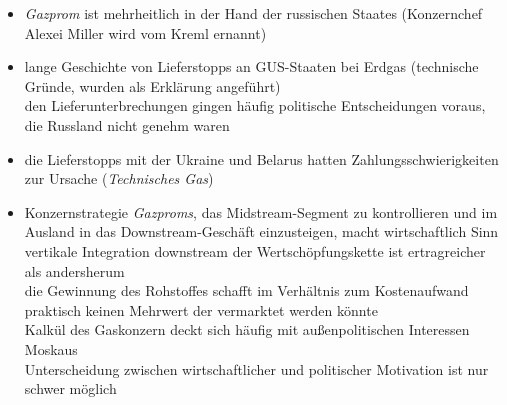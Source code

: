 \documentclass[11pt,a4paper]{article}
\begin{document}
\begin{itemize}

\item \emph{Gazprom} ist mehrheitlich in der Hand der russischen Staates (Konzernchef Alexei Miller wird vom Kreml ernannt)

\item lange Geschichte von Lieferstopps an GUS-Staaten bei Erdgas (technische Gründe, wurden als Erklärung angeführt)\\
 den Lieferunterbrechungen gingen häufig politische Entscheidungen voraus, die Russland nicht genehm waren


\item die Lieferstopps mit der Ukraine und Belarus hatten Zahlungsschwierigkeiten zur Ursache (\textsl{Technisches Gas})


\item Konzernstrategie \emph{Gazproms}, das Midstream-Segment zu kontrollieren und im Ausland in das Downstream-Geschäft einzusteigen, macht wirtschaftlich Sinn\\
 vertikale Integration downstream der Wertschöpfungskette ist ertragreicher als andersherum\\
 die Gewinnung des Rohstoffes schafft im Verhältnis zum Kostenaufwand praktisch keinen Mehrwert der vermarktet werden könnte\\
 Kalkül des Gaskonzern deckt sich häufig mit außenpolitischen Interessen Moskaus\\
 Unterscheidung zwischen wirtschaftlicher und politischer Motivation ist nur schwer möglich

\end{itemize}



\subsection*{}
\end{document}
